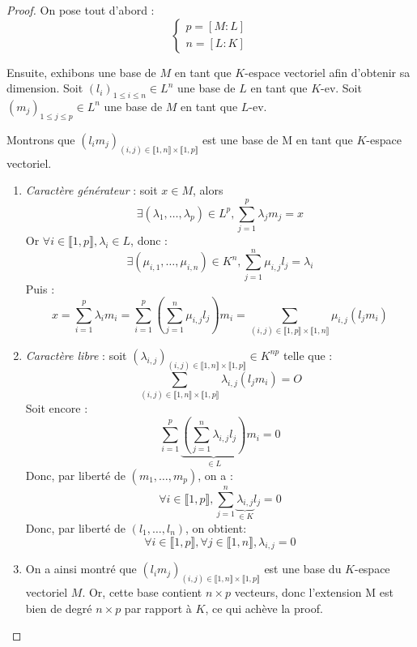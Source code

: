 \documentclass[a4paper,12pt,french,draft]{report}
\begin{document}
				\begin{proof}
					On pose tout d'abord :
					\[
					\left\{
						\begin{array}{ll}
							p = [M:L] \\
							n = [L:K]
						\end{array}
					\right.
					\]
					
					
					Ensuite, exhibons une base de \(M\) en tant que \(K\)-espace vectoriel afin d'obtenir sa dimension.
					Soit \((l_i)_{1 \leq i \leq n} \in L^n\) une base de \(L\) en tant que \(K\)-ev.
					Soit \((m_j)_{1 \leq j \leq p} \in L^n\) une base de \(M\) en tant que \(L\)-ev.
					
					Montrons que \((l_i m_j)_{(i, j) \in \llbracket 1, n \rrbracket \times \llbracket 1, p \rrbracket}\) est une base de M en tant que \(K\)-espace vectoriel.
					\begin{enumerate}
					\item \emph{Caractère générateur} : soit \(x \in M\), alors 
						\[
						\exists (\lambda_1, \dots, \lambda_p) \in L^p, \sum_{j  = 1}^{p} \lambda_j m_j = x
						\]
						Or \(\forall i \in \llbracket 1, p \rrbracket, \lambda_i \in L\), donc :
						\[ 
						\exists (\mu_{i, 1}, \dots, \mu_{i, n}) \in K^n, \sum_{j  = 1}^{n} \mu_{i, j} l_j = \lambda_i 
						\]
						Puis :
						\[
						x 	= \sum_{i  = 1}^{p} \lambda_i m_i  
							= \sum_{i  = 1}^{p} \left(\sum_{j  = 1}^{n} \mu_{i, j} l_j\right) m_i 
							= \sum_{(i, j) \in \llbracket 1, p \rrbracket \times \llbracket 1, n \rrbracket}\mu_{i, j} (l_j m_i)
						\]
					\item \emph{Caractère libre} : soit \((\lambda_{i, j})_{ (i, j) \in \llbracket 1, n \rrbracket \times \llbracket 1, p \rrbracket} \in K^{np}\) telle que :
							\[
							\sum_{(i, j) \in \llbracket 1, n \rrbracket \times \llbracket 1, p \rrbracket} \lambda_{i, j} (l_j m_i) = O
							\]
						Soit encore :
							\[
							\sum_{i=1}^{p} \underbrace{\left( \sum_{j = 1}^{n} \lambda_{i, j} l_j \right)}_{\in L}m_i = 0
							\]
						Donc, par liberté de \((m_1, \dots, m_p)\), on a :
							\[
							\forall i \in \llbracket 1, p \rrbracket, \sum_{j = 1}^{n} \underbrace{\lambda_{i, j}}_{\in K} l_j = 0
							\]
						Donc, par liberté de \((l_1, \dots, l_n)\), on obtient:
							\[
							\forall i \in \llbracket 1, p \rrbracket, \forall j \in \llbracket 1, n \rrbracket, \lambda_{i, j} = 0
							\]
					\item On a ainsi montré que \((l_i m_j)_{(i, j) \in \llbracket 1, n \rrbracket \times \llbracket 1, p \rrbracket}\) est une base du \(K\)-espace vectoriel \(M\). Or, cette base contient \(n\times p\) vecteurs, donc l'extension M est bien de degré \(n\times p\) par rapport à \(K\), ce qui achève la proof. \( \)
					
					\end{enumerate}
				\end{proof}
    
\end{document}
